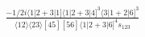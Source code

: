 \documentclass[varwidth, border=5pt]{standalone}
\begin{document}
\begin{my}
$\begin{gathered}
\scriptscriptstyle\frac{-1/2i\langle1|2+3|1]\langle1|2+3|4]^3\langle3|1+2|6]^3}{\langle12\rangle\langle23\rangle[45][56]\langle1|2+3|6]^4s_{123}}
\end{gathered}$
\end{my}
\end{document}
